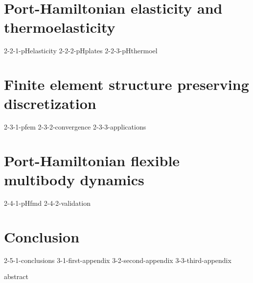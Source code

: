 \documentclass[a4paper,11pt,twoside]{templates/roque-phdthesis-template}
\begin{document}
\part{Port-Hamiltonian elasticity and thermoelasticity}
{2-2-1-pHelasticity}
{2-2-2-pHplates}
{2-2-3-pHthermoel}

\part{Finite element structure preserving discretization}
{2-3-1-pfem}
{2-3-2-convergence}
{2-3-3-applications}

\part{Port-Hamiltonian flexible multibody dynamics}
{2-4-1-pHfmd}
{2-4-2-validation}


\part*{Conclusion}
{2-5-1-conclusions}
\appendix
{3-1-first-appendix}
{3-2-second-appendix}
{3-3-third-appendix}

 


\cleardoublepage
{abstract}
\end{document}
